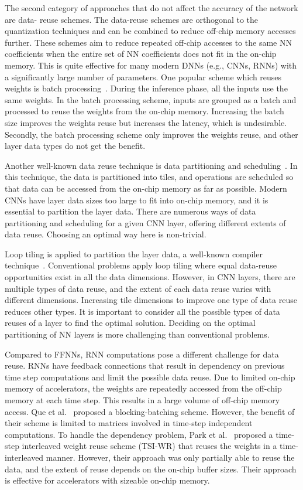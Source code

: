 The second category of approaches that do not affect the accuracy of the network are data-
reuse schemes. The data-reuse schemes are orthogonal to the quantization techniques and can be combined to reduce off-chip memory accesses further. These schemes aim to reduce repeated off-chip accesses to the same NN coefficients when the entire set of NN coefficients does not fit in the on-chip memory. This is quite effective for many modern DNNs (e.g., CNNs, RNNs) with a significantly large number of parameters. One popular scheme which reuses weights is batch processing~\cite{zhang2015optimizing,Li2018SmartShuttleOO,que2019efficient}. During the inference phase, all the inputs use the same weights. In the batch processing scheme, inputs are grouped as a batch and processed to reuse the weights from the on-chip memory. Increasing the batch size improves the weights reuse but increases the latency, which is undesirable. Secondly, the batch processing scheme only improves the weights reuse, and other layer data types do not get the benefit.

Another well-known data reuse technique is data partitioning and scheduling~\cite{zhang2015optimizing, Li2018SmartShuttleOO}. In this technique, the data is partitioned into tiles, and operations are scheduled so that data can be accessed from the on-chip memory as far as possible. Modern CNNs have layer data sizes too large to fit into on-chip memory, and it is essential to partition the layer data. There are numerous ways of data partitioning and scheduling for a given CNN layer, offering different extents of data reuse. Choosing an optimal way here is non-trivial.

Loop tiling is applied to partition the layer data, a well-known compiler technique~\cite{aho2006compilers}. Conventional problems apply loop tiling where equal data-reuse opportunities exist in all the data dimensions. However, in CNN layers, there are multiple types of data reuse, and the extent of each data reuse varies with different dimensions. Increasing tile dimensions to improve one type of data reuse reduces other types. It is important to consider all the possible types of data reuses of a layer to find the optimal solution. Deciding on the optimal partitioning of NN layers is more challenging than conventional problems.

Compared to FFNNs, RNN computations pose a different challenge for data reuse. RNNs have feedback connections that result in dependency on previous time step computations and limit the possible data reuse. Due to limited on-chip memory of accelerators, the weights are repeatedly accessed from the off-chip memory at each time step. This results in a large volume of off-chip memory access. Que et al.~\cite{que2019efficient} proposed a blocking-batching scheme. However, the benefit of their scheme is limited to matrices involved in time-step independent computations. To handle the dependency problem, Park et al.~\cite{park2020time} proposed a time-step interleaved weight reuse scheme (TSI-WR) that reuses the weights in a time-interleaved manner. However, their approach was only partially able to reuse the data, and the extent of reuse depends on the on-chip buffer sizes. Their approach is effective for accelerators with sizeable on-chip memory.
